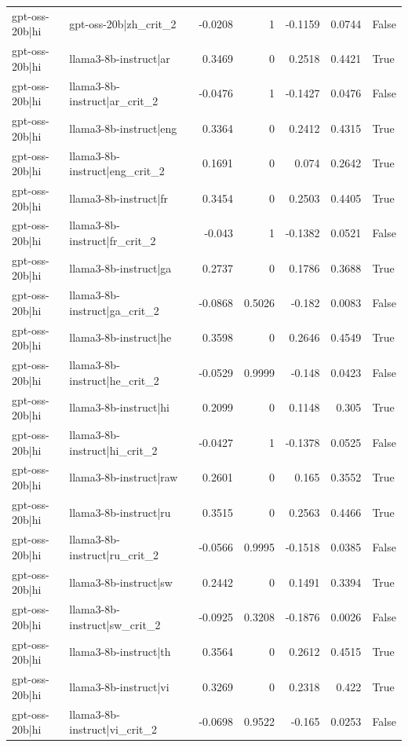 \begin{table}
\begin{tabular}{l l r r r r l}
gpt-oss-20b|hi & gpt-oss-20b|zh_crit_2 & -0.0208 & 1 & -0.1159 & 0.0744 & False \\
gpt-oss-20b|hi & llama3-8b-instruct|ar & 0.3469 & 0 & 0.2518 & 0.4421 & True \\
gpt-oss-20b|hi & llama3-8b-instruct|ar_crit_2 & -0.0476 & 1 & -0.1427 & 0.0476 & False \\
gpt-oss-20b|hi & llama3-8b-instruct|eng & 0.3364 & 0 & 0.2412 & 0.4315 & True \\
gpt-oss-20b|hi & llama3-8b-instruct|eng_crit_2 & 0.1691 & 0 & 0.074 & 0.2642 & True \\
gpt-oss-20b|hi & llama3-8b-instruct|fr & 0.3454 & 0 & 0.2503 & 0.4405 & True \\
gpt-oss-20b|hi & llama3-8b-instruct|fr_crit_2 & -0.043 & 1 & -0.1382 & 0.0521 & False \\
gpt-oss-20b|hi & llama3-8b-instruct|ga & 0.2737 & 0 & 0.1786 & 0.3688 & True \\
gpt-oss-20b|hi & llama3-8b-instruct|ga_crit_2 & -0.0868 & 0.5026 & -0.182 & 0.0083 & False \\
gpt-oss-20b|hi & llama3-8b-instruct|he & 0.3598 & 0 & 0.2646 & 0.4549 & True \\
gpt-oss-20b|hi & llama3-8b-instruct|he_crit_2 & -0.0529 & 0.9999 & -0.148 & 0.0423 & False \\
gpt-oss-20b|hi & llama3-8b-instruct|hi & 0.2099 & 0 & 0.1148 & 0.305 & True \\
gpt-oss-20b|hi & llama3-8b-instruct|hi_crit_2 & -0.0427 & 1 & -0.1378 & 0.0525 & False \\
gpt-oss-20b|hi & llama3-8b-instruct|raw & 0.2601 & 0 & 0.165 & 0.3552 & True \\
gpt-oss-20b|hi & llama3-8b-instruct|ru & 0.3515 & 0 & 0.2563 & 0.4466 & True \\
gpt-oss-20b|hi & llama3-8b-instruct|ru_crit_2 & -0.0566 & 0.9995 & -0.1518 & 0.0385 & False \\
gpt-oss-20b|hi & llama3-8b-instruct|sw & 0.2442 & 0 & 0.1491 & 0.3394 & True \\
gpt-oss-20b|hi & llama3-8b-instruct|sw_crit_2 & -0.0925 & 0.3208 & -0.1876 & 0.0026 & False \\
gpt-oss-20b|hi & llama3-8b-instruct|th & 0.3564 & 0 & 0.2612 & 0.4515 & True \\
gpt-oss-20b|hi & llama3-8b-instruct|vi & 0.3269 & 0 & 0.2318 & 0.422 & True \\
gpt-oss-20b|hi & llama3-8b-instruct|vi_crit_2 & -0.0698 & 0.9522 & -0.165 & 0.0253 & False \\

\end{tabular}
\end{table}
